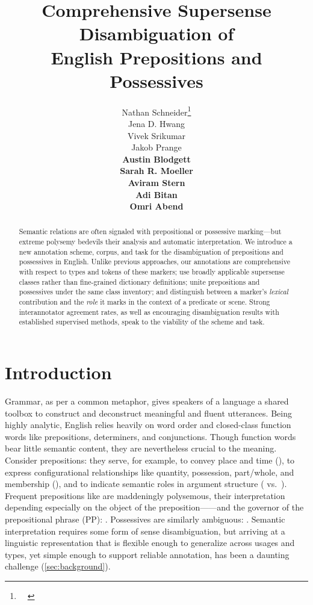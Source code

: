 \pdfoutput=1 \documentclass[11pt,a4paper]{article}
\title{Comprehensive Supersense Disambiguation of\\ English Prepositions and Possessives}
\author{
Nathan Schneider\thanks{~~\emldisplay{nathan.schneider@georgetown.edu}{nathan.schneider@georgetown.edu}} \\
	\textsmaller[.5]{Georgetown University} 
     \And
Jena D. Hwang \\
	\textsmaller[.5]{IHMC} 
\And
Vivek Srikumar \\
	\textsmaller[.5]{University of Utah} 
\AND
Jakob Prange\\
\bf Austin Blodgett \\
	\textsmaller[.5]{Georgetown University} 
\And 
Sarah R. Moeller \\
	\textsmaller[.5]{University of Colorado Boulder} 
\And
Aviram Stern\\
\bf Adi Bitan\\
\bf Omri Abend \\
	\textsmaller[.5]{Hebrew University of Jerusalem} 
}
\date{}
\begin{document}
\maketitle
\begin{abstract}
  Semantic relations are often signaled with prepositional or possessive marking---but extreme polysemy bedevils their analysis and automatic interpretation.
  We introduce a new annotation scheme, corpus, and task for the disambiguation 
  of prepositions and possessives in English.
  Unlike previous approaches, our annotations are comprehensive with respect to types and tokens of these markers; 
  use broadly applicable supersense classes rather than fine-grained dictionary definitions; 
  unite prepositions and possessives under the same class inventory; 
  and distinguish between a marker's \emph{lexical} contribution and the \emph{role} it marks in the context of a predicate or scene.
Strong interannotator agreement rates, as well as encouraging disambiguation results with established supervised methods, speak to the viability of the scheme and task.
\end{abstract}

\section{Introduction}

Grammar, as per a common metaphor, gives speakers of a language a shared toolbox to construct and deconstruct meaningful and fluent utterances. Being highly analytic, English relies heavily on word order and closed-class function words like prepositions, determiners, and conjunctions. Though function words bear little semantic content, they are nevertheless crucial to the meaning. Consider prepositions: they serve, for example, to convey place and time (), to express configurational relationships like quantity, possession, part/whole, and membership (), and to indicate semantic roles in argument structure ( vs.~).
Frequent prepositions like  are maddeningly polysemous, their interpretation depending especially on the object of the preposition------and the governor of the prepositional phrase (PP): .
Possessives are similarly ambiguous: .
Semantic interpretation requires some form of sense disambiguation, 
but arriving at a linguistic representation that is flexible enough to generalize across usages and types, yet simple enough to support reliable annotation, has been a daunting challenge (\cref{sec:background}).
\end{document}
